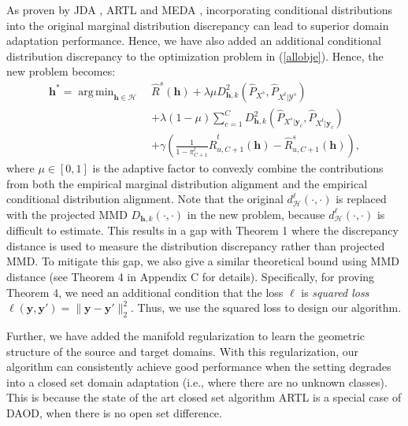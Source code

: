 \documentclass[journal]{IEEEtran}
\DeclareMathOperator*{\argmin}{arg\,min}
\begin{document}
As proven by JDA \cite{long2013transfer}, ARTL \cite{DBLP:journals/tkde/LongWDPY14} and MEDA \cite{DBLP:conf/mm/WangFCYHY18}, incorporating conditional distributions into the original marginal distribution discrepancy can lead to superior domain adaptation performance. Hence, we have also added an additional conditional distribution discrepancy to the optimization problem in (\ref{allobje}). Hence, the new problem becomes:
\begin{equation*}
  \begin{split}
    {\bm h}^*=\argmin_{{\bm h}\in \mathcal{H}} ~ &\widehat{R}^s({\bm h})
    +\lambda \mu D_{{\bm h},k}^2(\widehat{P}_{X^s},\widehat{P}_{X^t|\mathcal{Y}^s})
    \\
    &+\lambda (1-\mu)\sum_{c=1}^C D_{{\bm h},k}^2(\widehat{P}_{X^s|{\mathbf{y}}_c},\widehat{P}_{X^t|{\mathbf{y}}_c})
    \\
    &+\gamma \left(\frac{1}{1-\pi_{C+1}^t}\widehat{R}^t_{u,C+1}({\bm h})
 -\widehat{R}^s_{u,C+1}({\bm h})\right),
    \end{split}
\end{equation*}
 where $\mu\in [0,1]$ is the adaptive factor \cite{DBLP:conf/mm/WangFCYHY18} to convexly combine the contributions from both the empirical marginal distribution alignment and the empirical conditional distribution alignment. Note that the original $d^{\ell}_{\mathcal{H}}(\cdot,\cdot)$ is replaced with the projected MMD $D_{{\bm h},k}(\cdot, \cdot)$ in the new problem, because $d^{\ell}_{\mathcal{H}}(\cdot,\cdot)$ is difficult to estimate. 
  This results in a gap with Theorem 1 where  the discrepancy distance is used to measure the distribution discrepancy rather than projected MMD. To mitigate this gap, we also give a similar theoretical bound using MMD distance (see Theorem 4 in Appendix C for details). Specifically, for proving Theorem 4, we need an additional condition that the loss $\ell$ is {\textit{squared loss}} $\ell(\mathbf{y},\mathbf{y}')=\|\mathbf{y}-\mathbf{y}'\|^2_2$. Thus, we use the squared loss to design our algorithm.

{Further, we have added the manifold regularization} \cite{DBLP:journals/jmlr/BelkinNS06} {to learn the geometric structure of the source and target domains. With this regularization, our algorithm can consistently achieve good performance when the setting degrades into a closed set domain adaptation (i.e., where there are no unknown classes). This is because the state of the art closed set algorithm ARTL} \cite{DBLP:journals/tkde/LongWDPY14} {is a special case of DAOD, when there is no open set difference.} 
\end{document}
